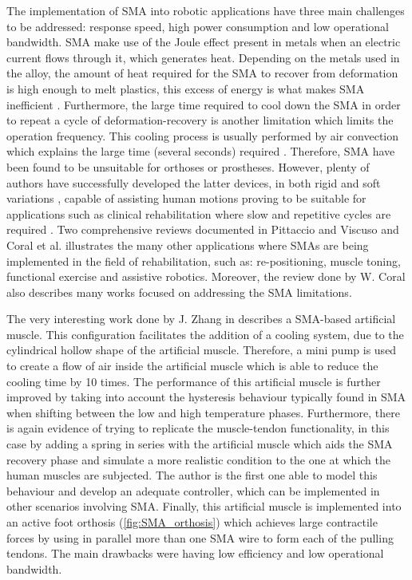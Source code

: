 The implementation of SMA into robotic applications have three main challenges to be addressed: response speed, high power consumption and low operational bandwidth. SMA make use of the Joule effect present in metals when an electric current flows through it, which generates heat. Depending on the metals used in the alloy, the amount of heat required for the SMA to recover from deformation is high enough to melt plastics, this excess of energy is what makes SMA inefficient \cite{Bundhoo2009a}. Furthermore, the large time required to cool down the SMA in order to repeat a cycle of deformation-recovery is another limitation which limits the operation frequency. This cooling process is usually performed by air convection which explains the large time (several seconds) required \cite{Bundhoo2009}. Therefore, SMA have been found to be unsuitable for orthoses or prostheses. However, plenty of authors have successfully developed the latter devices, in both rigid \cite{tarkesh2007} and soft variations \cite{Stirling2011}, capable of assisting human motions proving to be suitable for applications such as clinical rehabilitation where slow and repetitive cycles are required \cite{Pittaccio2009,Chenal2014}. Two comprehensive reviews documented in Pittaccio and Viscuso \cite{pittaccio2012shape} and Coral et al. \cite{Coral2012} illustrates the many other applications where SMAs are being implemented in the field of rehabilitation, such as: re-positioning, muscle toning, functional exercise and assistive robotics. Moreover, the review done by W. Coral \cite{Coral2012} also describes many works focused on addressing the SMA limitations.

The very interesting work done by J. Zhang in \cite{Zhang2013a} describes a SMA-based artificial muscle. This configuration facilitates the addition of a cooling system, due to the cylindrical hollow shape of the artificial muscle. Therefore, a mini pump is used to create a flow of air inside the artificial muscle which is able to reduce the cooling time by 10 times. The performance of this artificial muscle is further improved by taking into account the hysteresis behaviour typically found in SMA when shifting between the low and high temperature phases. Furthermore, there is again evidence of trying to replicate the muscle-tendon functionality, in this case by adding a spring in series with the artificial muscle which aids the SMA recovery phase and simulate a more realistic condition to the one at which the human muscles are subjected. The author is the first one able to model this behaviour and develop an adequate controller, which can be implemented in other scenarios involving SMA. Finally, this artificial muscle is implemented into an active foot orthosis (\autoref{fig:SMA_orthosis}) which achieves large contractile forces by using in parallel more than one SMA wire to form each of the pulling tendons. The main drawbacks were having low efficiency and low operational bandwidth.

